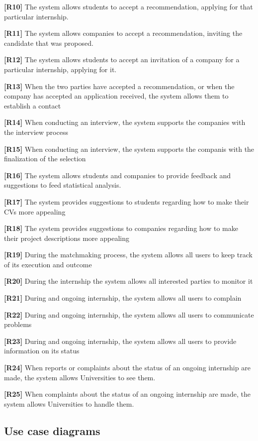 \textbf{[R10]} The system allows students to accept a recommendation, applying for that particular internship. 

\textbf{[R11]} The system allows companies to accept a recommendation, inviting the candidate that was proposed.

\textbf{[R12]} The system allows students to accept an invitation of a company for a particular internship, applying for it.

\textbf{[R13]}  When the two parties have accepted a recommendation, or when the company has accepted an application received, the system allows them to establish a contact

\textbf{[R14]} When conducting an interview, the system supports the companies with the interview process

\textbf{[R15]} When conducting an interview, the system supports the companis with the finalization of the selection

\textbf{[R16]} The system allows students and companies to provide feedback and suggestions to feed statistical analysis.

\textbf{[R17] }The system provides suggestions to students regarding how to make their CVs more appealing

\textbf{[R18]} The system provides suggestions to companies regarding how to make their project descriptions more appealing

\textbf{[R19]} During the matchmaking process, the system allows all users to keep track of its execution and outcome

\textbf{[R20]} During the internship the system allows all interested parties to monitor it

\textbf{[R21]} During and ongoing internship, the system allows all users to complain 

\textbf{[R22]} During and ongoing internship, the system allows all users to communicate problems 

\textbf{[R23]} During and ongoing internship, the system allows all users to provide information on its status

\textbf{[R24]} When reports or complaints about the status of an ongoing internship are made, the system allows Universities to see them.

\textbf{[R25]} When complaints about the status of an ongoing internship are made, the system allows Universities to handle them.

\pagebreak

\subsection{Use case diagrams}



